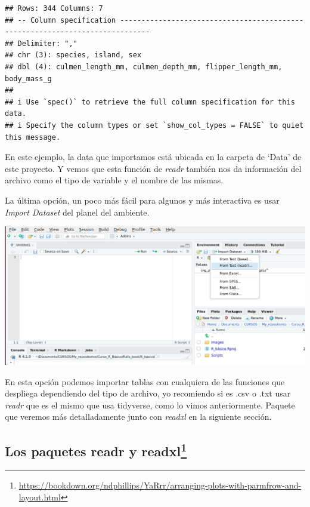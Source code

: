 \documentclass[
]{book}
\begin{document}
\begin{verbatim}
## Rows: 344 Columns: 7
## -- Column specification -----------------------------------------------------------------------------
## Delimiter: ","
## chr (3): species, island, sex
## dbl (4): culmen_length_mm, culmen_depth_mm, flipper_length_mm, body_mass_g
## 
## i Use `spec()` to retrieve the full column specification for this data.
## i Specify the column types or set `show_col_types = FALSE` to quiet this message.
\end{verbatim}

\hfill\break

En este ejemplo, la data que importamos está ubicada en la carpeta de `Data' de este proyecto.
Y vemos que esta función de \emph{readr} también nos da información del archivo como el tipo de variable y el nombre de las mismas.

La última opción, un poco más fácil para algunos y más interactiva es usar \emph{Import Dataset} del planel del ambiente.

\begin{center}\includegraphics[width=500pt]{images//import} \end{center}

En esta opción podemos importar tablas con cualquiera de las funciones que despliega dependiendo del tipo de archivo, yo recomiendo si es .csv o .txt usar \emph{readr} que es el mismo que usa tidyverse, como lo vimos anteriormente.
Paquete que veremos más detalladamente junto con \emph{readxl} en la siguiente sección.

\subsection[Los paquetes readr y readxl]{\texorpdfstring{Los paquetes readr y readxl\footnote{\url{https://bookdown.org/ndphillips/YaRrr/arranging-plots-with-parmfrow-and-layout.html}}}{Los paquetes readr y readxl}}\label{los-paquetes-readr-y-readxl1}
\end{document}
